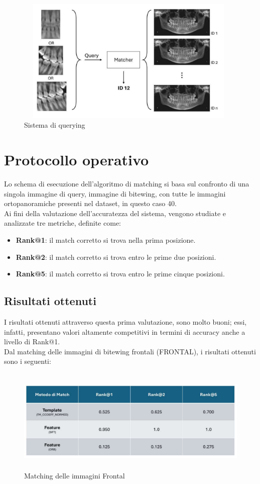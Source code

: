 \documentclass[12pt,a4paper,openright,twoside]{book}
\begin{document}
\begin{figure}[H]
	\centering
	\includegraphics[height=6cm,width=11cm]{figures/matchprof.pdf}
    	\caption{Sistema di querying}
	\label{fig:featurematching}
\end{figure}


\section{Protocollo operativo}
Lo schema di esecuzione dell'algoritmo di matching si basa sul confronto di una singola immagine di query, immagine di bitewing, con tutte le immagini ortopanoramiche presenti nel dataset, in questo caso 40.\\
Ai fini della valutazione dell'accuratezza del sistema, vengono studiate e analizzate tre metriche, definite come:
\begin{itemize}
\item \textbf{Rank@1}: il match corretto si trova nella prima posizione.
\item \textbf{Rank@2}: il match corretto si trova entro le prime due posizioni.
\item \textbf{Rank@5}: il match corretto si trova entro le prime cinque posizioni.
\end{itemize}

\subsection{Risultati ottenuti}
I risultati ottenuti attraverso questa prima valutazione, sono molto buoni; essi, infatti, presentano valori altamente competitivi in termini di accuracy anche a livello di Rank@1.\\
Dal matching delle immagini di bitewing frontali (FRONTAL), i risultati ottenuti sono i seguenti:

\begin{figure}[H]
	\centering
	\includegraphics[height=5cm,width=15cm]{figures/frontalprof.pdf}
    	\caption{Matching delle immagini Frontal}
	\label{fig:frontalprof}
\end{figure}
\end{document}
